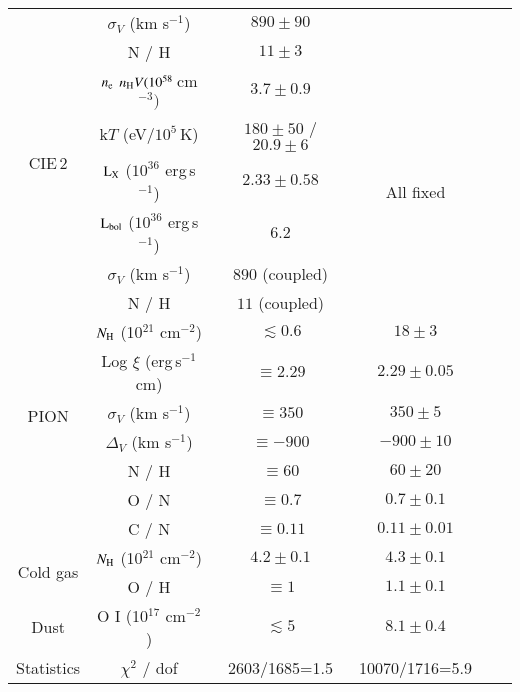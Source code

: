 \documentclass{aa}
\begin{document}
\begin{table*}
\begin{center}
\begin{tabular}{c | c | c | c c c}
    & $\sigma_V$ (km s$^{-1}$)                       &  $890\pm90$               & \\
    & N / H                                          &  $11\pm 3$                & \\
\hline
\multirow{4}{*}{CIE\,2} & $n_{\rm e}$ $n_{\rm H} V (10^{58}$\,cm$^{-3})$         & $3.7\pm0.9$    &  \multirow{6}{*}{All fixed}  \\
    & k$T$ (eV/$10^5$\,K)                           &  $180\pm50$ / $20.9\pm6$   & \\
    & ${\rm L}_{\rm X}$ ($10^{36}$ erg\,s$^{-1}$)   &  $2.33\pm0.58$             & \\
    & ${\rm L}_{\rm bol}$ ($10^{36}$ erg\,s$^{-1}$) &  $6.2$                     & \\
    & $\sigma_V$ (km s$^{-1}$)                      &  $890$ (coupled)           & \\
    & N / H                                         &  $11$  (coupled)           & \\
\hline
\multirow{6}{*}{PION}& $N_{\rm H}$ (10$^{21}$ cm$^{-2}$)   & $\lesssim0.6$   & $ 18\pm3$      \\
    &  Log $\xi$ (erg\,s$^{-1}$ cm)  & $ \equiv 2.29 $                     & $ 2.29\pm0.05$ \\
    & $\sigma_V$     (km s$^{-1}$)   & $ \equiv 350  $                     & $ 350\pm5 $       \\
    & $\Delta_V$     (km s$^{-1}$)   & $ \equiv -900 $                     & $-900\pm10$     \\
    &  N / H                         & $ \equiv 60 $                       & $ 60\pm 20 $       \\
    &  O / N                         & $ \equiv 0.7 $                      & $ 0.7\pm0.1 $      \\
    &  C / N                         & $ \equiv 0.11 $                     & $ 0.11\pm0.01 $   \\
\hline
\multirow{2}{*}{Cold gas}   & $N_{\rm H}$ (10$^{21}$ cm$^{-2}$) &  $4.2\pm0.1$    &  $4.3\pm0.1$      \\
    &   O / H                               & $ \equiv 1 $      &  $1.1\pm0.1$      \\
\hline
\multirow{1}{*}{Dust}   &O {\scriptsize{I}} (10$^{17}$ cm$^{-2}$)  &  $\lesssim5$  &  $8.1\pm0.4$   \\
\hline
Statistics    &    $\chi^2$ / dof           &  2603/1685=1.5     &  10070/1716=5.9   \\
 \hline

\end{tabular}
\end{center}
\end{table*}
\end{document}
